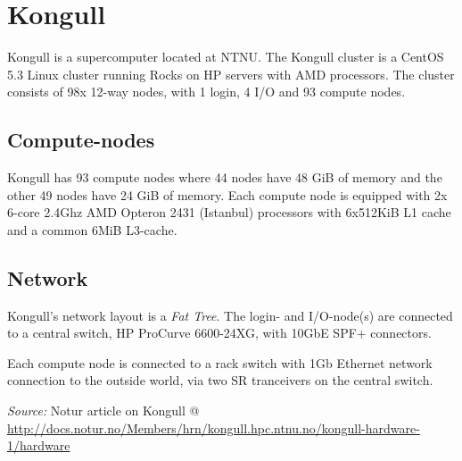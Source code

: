 \clearpage
\section{Kongull} %
\label{sec:appendix_kongull}
Kongull is a supercomputer located at NTNU. The Kongull cluster is a CentOS 5.3 Linux cluster running Rocks on HP servers with AMD processors. The cluster consists of 98x 12-way nodes, with 1 login, 4 I/O and 93 compute nodes.

\subsection{Compute-nodes} %
\label{sub:compute_nodes}
Kongull has 93 compute nodes where 44 nodes have 48 GiB of memory and the other 49 nodes have 24 GiB of memory. Each compute node is equipped with 2x 6-core 2.4Ghz AMD Opteron 2431 (Istanbul) processors with 6x512KiB L1 cache and a common 6MiB L3-cache.

\subsection{Network} %
\label{sub:network}
Kongull's network layout is a \emph{Fat Tree}. The login- and I/O-node(s) are connected to a central switch, HP ProCurve 6600-24XG, with 10GbE SPF+ connectors.

Each compute node is connected to a rack switch with 1Gb Ethernet network connection to the outside world, via two SR tranceivers on the central switch.

\emph{Source: } Notur article on Kongull @ \url{http://docs.notur.no/Members/hrn/kongull.hpc.ntnu.no/kongull-hardware-1/hardware}

